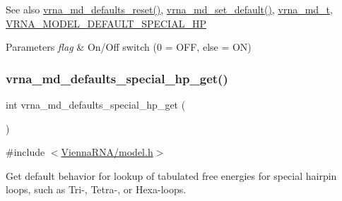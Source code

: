 \begin{DoxySeeAlso}{See also}
\mbox{\hyperlink{group__model__details_ga70834424cf804d149937de89f80ceb45}{vrna\+\_\+md\+\_\+defaults\+\_\+reset()}}, \mbox{\hyperlink{group__model__details_ga8ac6ff84936282436f822644bf841f66}{vrna\+\_\+md\+\_\+set\+\_\+default()}}, \mbox{\hyperlink{group__model__details_ga1f8a10e12a0a1915f2a4eff0b28ea17c}{vrna\+\_\+md\+\_\+t}}, \mbox{\hyperlink{group__model__details_gabd1ab224e1048defd45c165ed7d1c108}{V\+R\+N\+A\+\_\+\+M\+O\+D\+E\+L\+\_\+\+D\+E\+F\+A\+U\+L\+T\+\_\+\+S\+P\+E\+C\+I\+A\+L\+\_\+\+HP}} 
\end{DoxySeeAlso}

\begin{DoxyParams}{Parameters}
{\em flag} & On/\+Off switch (0 = O\+FF, else = ON) \\
\hline
\end{DoxyParams}
\mbox{\label{group__model__details_ga1d68a6efdaa1253cc63fd9cd06452559}} 
\subsubsection{\texorpdfstring{vrna\+\_\+md\+\_\+defaults\+\_\+special\+\_\+hp\+\_\+get()}{vrna\_md\_defaults\_special\_hp\_get()}}
{\footnotesize\ttfamily int vrna\+\_\+md\+\_\+defaults\+\_\+special\+\_\+hp\+\_\+get (\begin{DoxyParamCaption}\item[{void}]{ }\end{DoxyParamCaption})}



{\ttfamily \#include $<$\mbox{\hyperlink{model_8h}{Vienna\+R\+N\+A/model.\+h}}$>$}



Get default behavior for lookup of tabulated free energies for special hairpin loops, such as Tri-\/, Tetra-\/, or Hexa-\/loops. 

